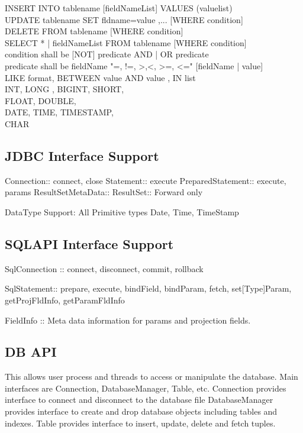 \documentclass[12pt]{article}
\begin{document}
INSERT INTO {tablename} [fieldNameList] VALUES ({valuelist}) \\

UPDATE {tablename} SET {fldname=value ,...} [WHERE {condition}] \\

DELETE FROM {tablename} [WHERE {condition}] \\

SELECT {* | fieldNameList} FROM {tablename} [WHERE {condition}] \\
     condition shall be [NOT] {predicate} {AND | OR } {predicate} \\
     predicate shall be {fieldName} {"=, !=, >,<, >=, <="} [fieldName | value] \\
                         LIKE {format}, BETWEEN {value} AND {value} , IN {list} \\

\label {DataType support:}
INT, LONG , BIGINT, SHORT, \\
FLOAT,  DOUBLE, \\
DATE, TIME,  TIMESTAMP, \\
CHAR \\


\subsection{JDBC Interface Support}
\label{JDBC Interface Support}

Connection:: connect, close
Statement:: execute
PreparedStatement:: execute, params
ResultSetMetaData::
ResultSet:: Forward only

DataType Support:
All Primitive types
Date, Time, TimeStamp

\subsection{SQLAPI Interface Support}
\label{SQLAPI Interface Support}

SqlConnection :: connect, disconnect, commit, rollback

SqlStatement:: prepare, execute,  bindField, bindParam,
               fetch, set[Type]Param, getProjFldInfo, getParamFldInfo

FieldInfo :: Meta data information for params and projection fields.


\subsection{DB API}
\label{dbapi}
This allows user process and threads to access or manipulate the database. Main interfaces are Connection, DatabaseManager, Table, etc.
Connection provides interface to connect and disconnect to the database file
DatabaseManager provides interface to create and drop database objects including tables and indexes.
Table provides interface to insert, update, delete and fetch tuples.
\end{document}
